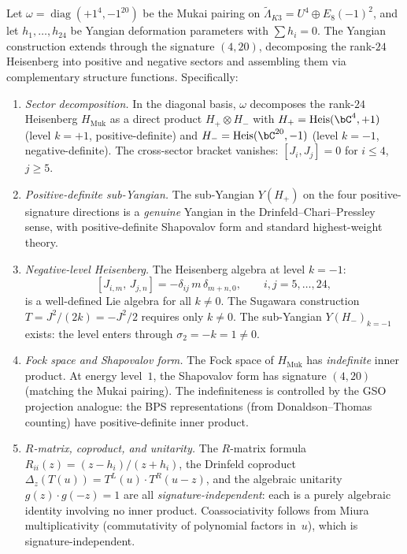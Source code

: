 \begin{proposition}
\label{prop:mukai-indefinite-yangian}
Let $\omega = \operatorname{diag}(+1^4, -1^{20})$ be the Mukai pairing
on $\widetilde{\Lambda}_{K3} = U^4 \oplus E_8(-1)^2$, and let
$h_1, \ldots, h_{24}$ be Yangian deformation parameters with
$\sum h_i = 0$. The Yangian construction extends through the
signature $(4, 20)$, decomposing the rank-$24$ Heisenberg into
positive and negative sectors and assembling them via complementary
structure functions. Specifically:
\begin{enumerate}[label=\textup{(\roman*)}]

\item \emph{Sector decomposition.}
In the diagonal basis, $\omega$ decomposes the rank-$24$ Heisenberg
$H_{\mathrm{Muk}}$ as a direct product
$H_+ \otimes H_-$ with $H_+ = \mathrm{Heis}(\bC^4, +1)$ (level $k=+1$,
positive-definite) and
$H_- = \mathrm{Heis}(\bC^{20}, -1)$ (level $k=-1$, negative-definite).
The cross-sector bracket vanishes: $[J_i, J_j] = 0$ for $i \leq 4$,
$j \geq 5$.

\item \emph{Positive-definite sub-Yangian.}
The sub-Yangian $Y(H_+)$ on the four positive-signature directions
is a \emph{genuine} Yangian in the Drinfeld--Chari--Pressley sense,
with positive-definite Shapovalov form and standard highest-weight theory.

\item \emph{Negative-level Heisenberg.}
The Heisenberg algebra at level $k = -1$:
\[
 [J_{i,m},\, J_{j,n}] = -\delta_{ij}\, m\, \delta_{m+n,0},
 \qquad i,j = 5, \ldots, 24,
\]
is a well-defined Lie algebra for all $k \neq 0$.
The Sugawara construction
$T = J^2/(2k) = -J^2/2$ requires only $k \neq 0$.
The sub-Yangian $Y(H_-)_{k=-1}$ exists: the level enters
through $\sigma_2 = -k = 1 \neq 0$.

\item \emph{Fock space and Shapovalov form.}
The Fock space of $H_{\mathrm{Muk}}$ has \emph{indefinite}
inner product. At energy level~$1$, the Shapovalov form has
signature $(4, 20)$ (matching the Mukai pairing).
The indefiniteness is controlled by the GSO projection
analogue: the BPS representations (from Donaldson--Thomas
counting) have positive-definite inner product.

\item \emph{$R$-matrix, coproduct, and unitarity.}
The $R$-matrix formula $R_{ii}(z) = (z - h_i)/(z + h_i)$,
the Drinfeld coproduct $\Delta_z(T(u)) = T^L(u) \cdot T^R(u-z)$,
and the algebraic unitarity $g(z) \cdot g(-z) = 1$ are all
\emph{signature-independent}: each is a purely algebraic
identity involving no inner product.
Coassociativity follows from Miura multiplicativity (commutativity
of polynomial factors in~$u$), which is signature-independent.


\end{enumerate}
\end{proposition}
